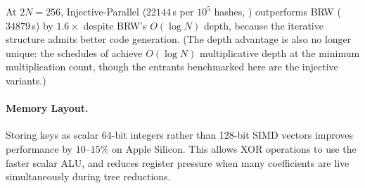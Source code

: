 At $2N = 256$, Injective-Parallel ($22144$\,\textmu s per $10^5$ hashes, ) outperforms BRW ($34879$\,\textmu s)
by $1.6\times$ despite BRW's $O(\log N)$ depth,
because the iterative structure admits better code generation.
(The depth advantage is also no longer unique: the schedules of
 achieve $O(\log N)$ multiplicative
depth at the minimum multiplication count, though the entrants benchmarked
here are the injective variants.)

\paragraph{Memory Layout.}
Storing keys as scalar 64-bit integers rather than 128-bit SIMD vectors improves
performance by $10$--$15\%$ on Apple Silicon.
This allows XOR operations to use the faster scalar ALU, and reduces register pressure
when many coefficients are live simultaneously during tree reductions.
